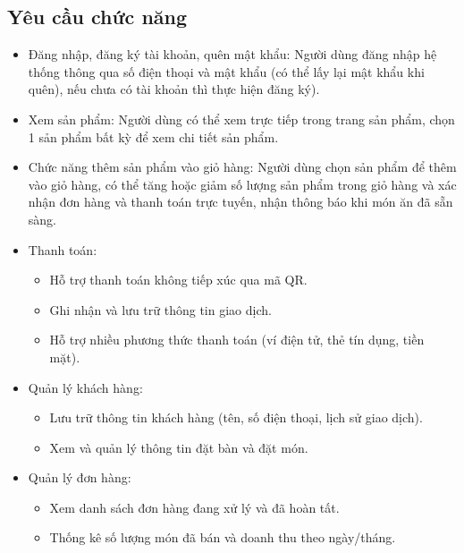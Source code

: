 \documentclass[a4paper]{article}
\begin{document}
\subsection{Yêu cầu chức năng}
\begin{itemize}
    \item Đăng nhập, đăng ký tài khoản, quên mật khẩu: Người dùng đăng nhập hệ thống thông qua số điện thoại và mật khẩu (có thể lấy lại mật khẩu khi quên), nếu chưa có tài khoản thì thực hiện đăng ký).
    \item Xem sản phẩm: Người dùng có thể xem trực tiếp trong trang sản phẩm, chọn 1 sản phẩm bất kỳ để xem chi tiết sản phẩm.
    \item Chức năng thêm sản phẩm vào giỏ hàng: Người dùng chọn sản phẩm để thêm vào giỏ hàng, có thể tăng hoặc giảm số lượng sản phẩm trong giỏ hàng và xác nhận đơn hàng và thanh toán trực tuyến, nhận thông báo khi món ăn đã sẵn sàng.

    \item Thanh toán:
          \begin{itemize}
              \item Hỗ trợ thanh toán không tiếp xúc qua mã QR.
              \item Ghi nhận và lưu trữ thông tin giao dịch.
              \item Hỗ trợ nhiều phương thức thanh toán (ví điện tử, thẻ tín dụng, tiền mặt).
          \end{itemize}
    \item Quản lý khách hàng:
          \begin{itemize}
              \item Lưu trữ thông tin khách hàng (tên, số điện thoại, lịch sử giao dịch).
              \item Xem và quản lý thông tin đặt bàn và đặt món.
          \end{itemize}
    \item Quản lý đơn hàng:
          \begin{itemize}
              \item Xem danh sách đơn hàng đang xử lý và đã hoàn tất.
              \item Thống kê số lượng món đã bán và doanh thu theo ngày/tháng.
          \end{itemize}
\end{itemize}
\end{document}
